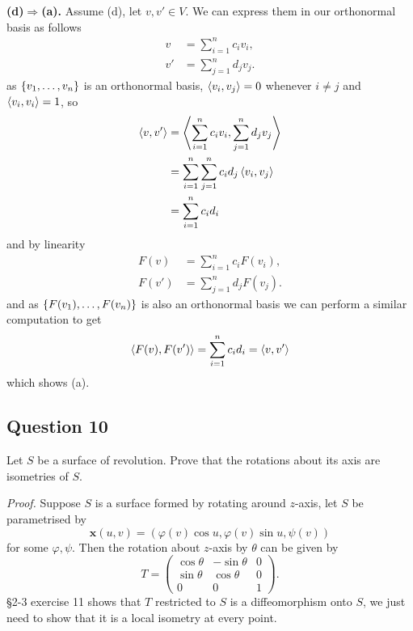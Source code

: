 \documentclass[12pt]{article}
\begin{document}
\textbf{(d)$\Rightarrow$(a).} Assume (d), let \(v,v'\in V\).
We can express them in our orthonormal basis as follows
\begin{align*}
    v &= \sum_{i=1}^n c_i v_i,\\
    v' &= \sum_{j=1}^n d_j v_j.
\end{align*}
as \(\left\{ v_1,\dots,v_n \right\}\) is an orthonormal basis, \(\left\langle v_i,v_j \right\rangle = 0\) whenever \(i\ne j\) and \(\left\langle v_i,v_i \right\rangle = 1\), so
\begin{align*}
    \left\langle v,v' \right\rangle &= \left\langle  \sum_{i=1}^n c_i v_i, \sum_{j=1}^n d_j v_j  \right\rangle \\
                 &= \sum_{i=1}^n \sum_{j=1}^n c_i d_j \left\langle v_i,v_j \right\rangle \\
                 &= \sum_{i=1}^n c_i d_i
\end{align*}
and by linearity
\begin{align*}
    F(v) &= \sum_{i=1}^n c_i F(v_i),\\
    F(v') &= \sum_{j=1}^n d_j F(v_j).
\end{align*}
and as \(\left\{ F(v_1),\dots,F(v_n) \right\}\) is also an orthonormal basis we can perform a similar computation to get
\[ \left\langle F(v),F(v') \right\rangle = \sum_{i=1}^n c_i d_i = \left\langle v,v' \right\rangle  \]
which shows (a).


\subsection*{Question 10}

Let \(S\) be a surface of revolution. Prove that the rotations about its axis are isometries of \(S\).

\emph{Proof.}
Suppose \(S\) is a surface formed by rotating around \(z\)-axis, let \(S\) be parametrised by
\[ \mathbf{x}(u,v) = (\varphi(v)\cos u, \varphi(v)\sin u, \psi(v)) \]
for some \(\varphi, \psi\).
Then the rotation about \(z\)-axis by \(\theta\) can be given by
\[ T = \begin{pmatrix}
    \cos\theta & -\sin\theta & 0 \\
    \sin\theta & \cos\theta & 0 \\
    0 & 0 & 1
\end{pmatrix}. \]
§2-3 exercise 11 shows that \(T\) restricted to \(S\) is a diffeomorphism onto \(S\),
we just need to show that it is a local isometry at every point.
\end{document}
